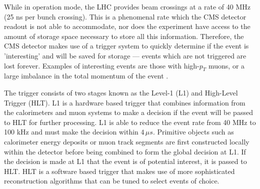 While in operation mode, the LHC provides beam crossings at a rate of 40 MHz (25 ns per bunch crossing). This is a phenomenal rate which the CMS detector readout is not able to accommodate, nor does the experiment have access to the amount of storage space necessary to store all this information. Therefore, the CMS detector makes use of a trigger system to quickly determine if the event is 'interesting' and will be saved for storage --- events which are not triggered are lost forever. Examples of interesting events are those with high-$p_{T}$ muons, or a large imbalance in the total momentum of the event \cite{CMS-TRG-12-001}.

The trigger consists of two stages known as the Level-1 (L1) and High-Level Trigger (HLT). L1 is a hardware based trigger that combines information from the calorimeters and muon systems to make a decision if the event will be passed to HLT for further processing. L1 is able to reduce the event rate from 40 MHz to 100 kHz and must make the decision within $4\,\mu s$. Primitive objects such as calorimeter energy deposits or muon track segments are first constructed locally within the detector before being combined to form the global decision at L1. If the decision is made at L1 that the event is of potential interest, it is passed to HLT. HLT is a software based trigger that makes use of more sophisticated reconstruction algorithms that can be tuned to select events of choice.

